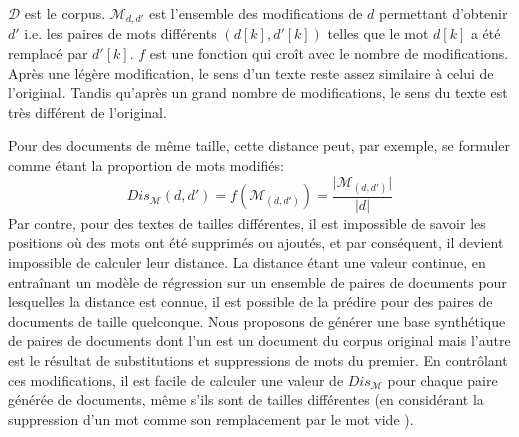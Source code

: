 $\mathcal{D}$ est le corpus. $\mathcal{M}_{d, d'}$ est l'ensemble des modifications de $d$ permettant d'obtenir $d'$ i.e. les paires de mots différents $(d[k], d'[k])$ telles que le mot $d[k]$ a été remplacé par $d'[k]$. $f$ est une fonction qui croît avec le nombre de modifications. Après une légère modification, le sens d'un texte reste assez similaire à celui de l'original. Tandis qu'après un grand nombre de modifications, le sens du texte est très différent de l'original. 

Pour des documents de même taille,  cette distance peut, par exemple, se formuler comme étant la proportion de mots modifiés:
\begin{equation}
{Dis_\mathcal{M}}(d,d') = {f}(\mathcal{M}_{(d,d')}) = \frac{\vert \mathcal{M}_{(d,d')} \vert}{\vert d \vert } \label{eq:similarite:taux-modif}
\end{equation}
 Par contre, pour des textes de tailles différentes, il est impossible de savoir les positions où des mots ont été supprimés ou ajoutés, et par conséquent, il devient impossible de calculer leur distance. La distance étant une valeur continue, en entraînant un modèle de régression sur un ensemble de paires de documents pour lesquelles la distance est connue, il est possible de la prédire pour des paires de documents de taille quelconque. Nous proposons de générer une base synthétique de paires de documents dont l'un est un document du corpus original mais l'autre est le résultat de substitutions et suppressions de mots du premier. En contrôlant ces modifications, il est facile de calculer une valeur de $Dis_\mathcal{M}$ pour chaque paire générée de documents, même s'ils sont de tailles différentes (en considérant la suppression d'un mot comme son remplacement par le \og mot vide \fg{}).

